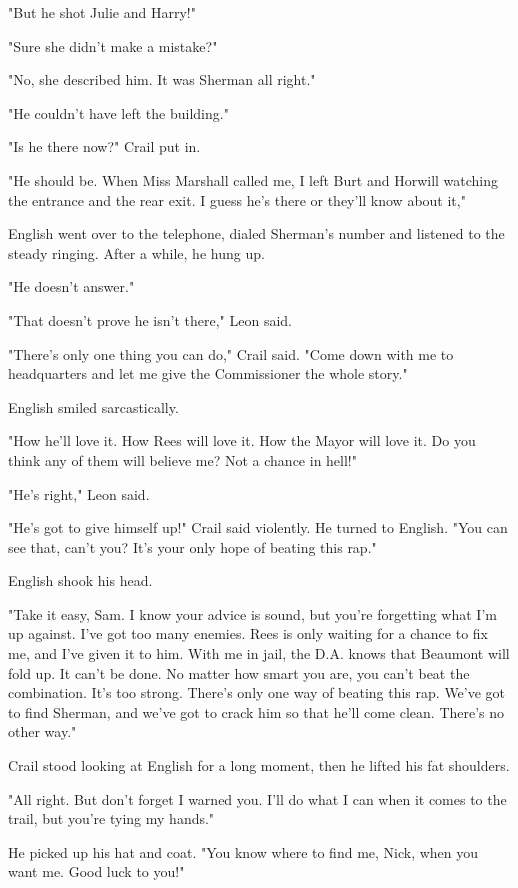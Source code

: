 \documentclass{novel}
\begin{document}
"But he shot Julie and Harry!"

"Sure she didn't make a mistake?"

"No, she described him. It was Sherman all right."

"He couldn't have left the building."

"Is he there now?" Crail put in.

"He should be. When Miss Marshall called me, I left Burt and Horwill watching the entrance and the rear exit. I guess he's there or they'll know about it,"

English went over to the telephone, dialed Sherman's number and listened to the steady ringing. After a while, he hung up.

"He doesn't answer."

"That doesn't prove he isn't there," Leon said.

"There's only one thing you can do," Crail said. "Come down with me to headquarters and let me give the Commissioner the whole story."

English smiled sarcastically.

"How he'll love it. How Rees will love it. How the Mayor will love it. Do you think any of them will believe me? Not a chance in hell!"

"He's right," Leon said.

"He's got to give himself up!" Crail said violently. He turned to English. "You can see that, can't you? It's your only hope of beating this rap."

English shook his head.

"Take it easy, Sam. I know your advice is sound, but you're forgetting what I'm up against. I've got too many enemies. Rees is only waiting for a chance to fix me, and I've given it to him. With me in jail, the D.A. knows that Beaumont will fold up. It can't be done. No matter how smart you are, you can't beat the combination. It's too strong. There's only one way of beating this rap. We've got to find Sherman, and we've got to crack him so that he'll come clean. There's no other way."

Crail stood looking at English for a long moment, then he lifted his fat shoulders.

"All right. But don't forget I warned you. I'll do what I can when it comes to the trail, but you're tying my hands."

He picked up his hat and coat. "You know where to find me, Nick, when you want me. Good luck to you!"
\end{document}
